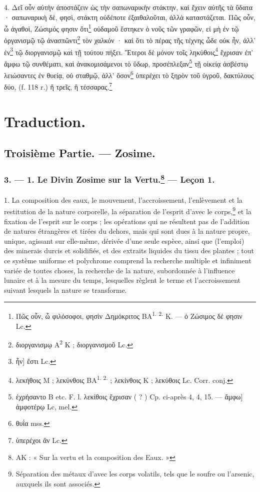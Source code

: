 \documentclass[landscape, a4paper, 11pt, oneside, polutonikogreek, french]{article}
\begin{document}
4. Δεῖ οὖν αὐτὴν ἀποστάζειν ὡς τὴν σαπωναρικὴν στάκτην, καὶ ἔχειν αὐτῆς τὰ ὕδατα · σαπωναρικὴ δὲ, φησὶ, στάκτη οὐδέποτε ἐξαιθαλοῦται, ἀλλὰ καταστάζεται. Πῶς οὖν, ὦ ἀγαθοὶ, Ζώσιμός φησιν ὅτι\footnote{Πῶς οὗν, ὦ φιλόσοφοι, φησὶν Δημόκριτος BA\textsuperscript{1. 2.} K. --- ὁ Ζώσιμος δέ φησιν Lc.} οὐδαμοῦ ἕστηκεν ὁ νοῦς τῶν γραφῶν, εἰ μὴ ἐν τῷ ὀργανισμῷ τῷ ἀνασπῶντι\footnote{διοργανισμῳ A\textsuperscript{2} K ; διοργανισμοῦ Lc.} τὸν χαλκόν · καὶ ὅτι τὸ πέρας τῆς τέχνης ὧδε οὐκ ἦν, ἀλλ' ἐν\footnote{ἦν] ἔστι Lc.} τῷ διοργανισμῷ καὶ τῇ τούτου πήξει. Ἕτεροι δὲ μόνον τοῖς ληκύθοις\footnote{λεκήθοις M ; λεκύνθοις BA\textsuperscript{1. 2.} ; λεκίνθοις K ; λεκύθοις Lc. Corr. conj.} ἕχρισαν ἐπ' ἄμφω τῷ συνθέματι, καὶ ἀνακομισάμενοι τὸ ὕδωρ, προσέπλεξαν\footnote{ἐχρήσαντο B etc. F. l. λεκίθοις ἔχρισαν ( ? ) Cp. ci-après 4, 4, 15. --- ἄμφω] ἀμφοτέρῳ Lc, mel.} τῇ οἰκείᾳ ἀσβέστῳ λειώσαντες ἐν θυείᾳ, οὐ σταθμῷ, ἀλλ' ὅσον\footnote{θυΐα mss.} ὑπερέχει τὸ ξηρὸν τοῦ ὑγροῦ, δακτύλους δύο, (f. 118 r.) ἢ τρεῖς, ἢ τέσσαρας.\footnote{ὑπερέχοι ἂν Lc.}

\bigskip
\centerline{\EightStarTaper}
\centerline{\EightStarTaper\EightStarTaper}
\bigskip
\clearpage
\setcounter{footnote}{0}
\section{Traduction.}
\subsection{Troisième Partie. --- Zosime.}
\subsubsection[3. --- 1. Le Divin Zosime sur la Vertu. --- Leçon 1.]{3. --- 1. Le Divin Zosime sur la Vertu.\footnote{AK : « Sur la vertu et la composition des Eaux. »} --- Leçon 1.}
\paragraph{}
1. La composition des eaux, le mouvement, l'accroissement, l'enlèvement et la restitution de la nature corporelle, la séparation de l'esprit d'avec le corps,\footnote{Séparation des métaux d'avec les corps volatils, tels que le soufre ou l'arsenic, auxquels ils sont associés.} et la fixation de l'esprit sur le corps ; les opérations qui ne résultent pas de l'addition de natures étrangères et tirées du dehors, mais qui sont dues à la nature propre, unique, agissant sur elle-même, dérivée d'une seule espèce, ainsi que (l'emploi) des minerais durcis et solidifiés, et des extraits liquides du tissu des plantes ; tout ce système uniforme et polychrome comprend la recherche multiple et infiniment variée de toutes choses, la recherche de la nature, subordonnée à l'influence lunaire et à la mesure du temps, lesquelles règlent le terme et l'accroissement suivant lesquels la nature se transforme.
\end{document}
